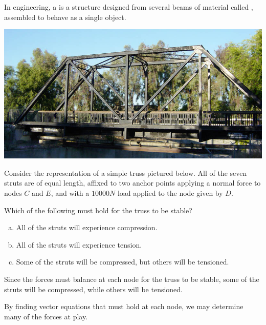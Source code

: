 \begin{applicationActivities}

\begin{example}
In engineering, a  is a structure designed from several beams
of material called , assembled to behave as a single object.

\begin{center}
\includegraphics[width=0.8\linewidth]{media/truss.jpg}
\end{center}
\end{example}

\begin{activity}{10}
Consider the representation of a simple truss pictured below.
All of the seven struts are of equal length, affixed to two anchor points
applying a normal force to nodes \(C\) and \(E\), and
with a \(10000 N\) load applied to the node given by \(D\).

\drawtruss{}

Which of the following must hold for the truss to be stable?
\begin{enumerate}[a)]
\item All of the struts will experience compression.
\item All of the struts will experience tension.
\item Some of the struts will be compressed, but others will be tensioned.
\end{enumerate}
\end{activity}

\begin{observation}
Since the forces must balance at each node for the truss to be stable,
some of the struts will be compressed, while others will be tensioned. 

\drawtruss{\trussCompletion}

By finding vector equations that must hold at each node, we may
determine many of the forces at play.
\end{observation}


\end{applicationActivities}
